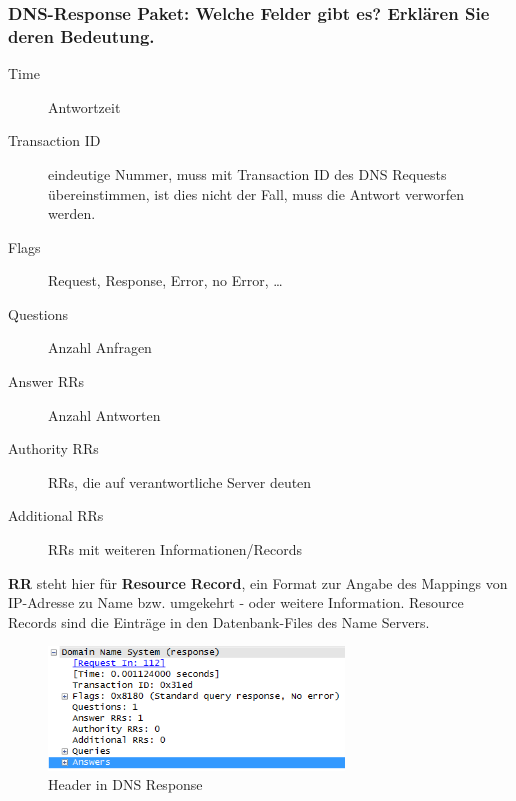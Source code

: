 \documentclass[a4paper,11pt]{scrartcl}
\begin{document}
\subsubsection{DNS-Response Paket: Welche Felder gibt es? Erklären Sie deren Bedeutung.}
\begin{description}
	\item[Time] Antwortzeit
	\item[Transaction ID] eindeutige Nummer, muss mit Transaction ID des DNS Requests übereinstimmen, ist dies nicht der Fall, muss die Antwort verworfen werden.
	\item[Flags] Request, Response, Error, no Error, \ldots
	\item[Questions] Anzahl Anfragen
	\item[Answer RRs] Anzahl Antworten
	\item[Authority RRs] RRs, die auf verantwortliche Server deuten
	\item[Additional RRs] RRs mit weiteren Informationen/Records
\end{description}
\textbf{RR} steht hier für \textbf{Resource Record}, ein Format zur Angabe des Mappings von IP-Adresse zu Name bzw. umgekehrt - oder weitere Information. Resource Records sind die Einträge in den Datenbank-Files des Name Servers.
\begin{figure}[h]
	\centering
	\includegraphics[width=0.7\textwidth]{../aufg2/dns_2_2_3.png}
	\caption{Header in DNS Response}
	\label{fig:dns_2_2_3}
\end{figure}
\end{document}
